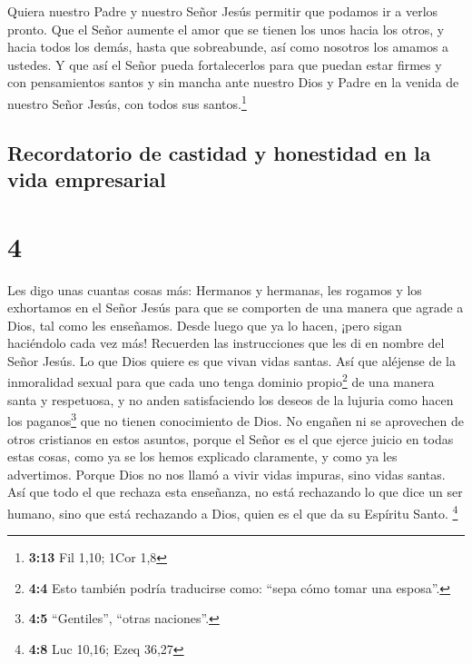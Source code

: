  Quiera nuestro Padre y nuestro Señor Jesús permitir que
podamos ir a verlos pronto.  Que el Señor aumente el amor
que se tienen los unos hacia los otros, y hacia todos los demás, hasta
que sobreabunde, así como nosotros los amamos a ustedes. 
Y que así el Señor pueda fortalecerlos para que puedan estar firmes y
con pensamientos santos y sin mancha ante nuestro Dios y Padre en la
venida de nuestro Señor Jesús, con todos sus santos.\footnote{\textbf{3:13}
  Fil 1,10; 1Cor 1,8}

\hypertarget{recordatorio-de-castidad-y-honestidad-en-la-vida-empresarial}{%
\subsection{Recordatorio de castidad y honestidad en la vida
empresarial}\label{recordatorio-de-castidad-y-honestidad-en-la-vida-empresarial}}

\hypertarget{section-3}{%
\section{4}\label{section-3}}

 Les digo unas cuantas cosas más: Hermanos y hermanas, les
rogamos y los exhortamos en el Señor Jesús para que se comporten de una
manera que agrade a Dios, tal como les enseñamos. Desde luego que ya lo
hacen, ¡pero sigan haciéndolo cada vez más!  Recuerden las
instrucciones que les di en nombre del Señor Jesús.  Lo
que Dios quiere es que vivan vidas santas. Así que aléjense de la
inmoralidad sexual  para que cada uno tenga dominio
propio\footnote{\textbf{4:4} Esto también podría traducirse como: ``sepa
  cómo tomar una esposa''.} de una manera santa y respetuosa,
 y no anden satisfaciendo los deseos de la lujuria como
hacen los paganos\footnote{\textbf{4:5} ``Gentiles'', ``otras
  naciones''.} que no tienen conocimiento de Dios.  No
engañen ni se aprovechen de otros cristianos en estos asuntos, porque el
Señor es el que ejerce juicio en todas estas cosas, como ya se los hemos
explicado claramente, y como ya les advertimos.  Porque
Dios no nos llamó a vivir vidas impuras, sino vidas santas.
 Así que todo el que rechaza esta enseñanza, no está
rechazando lo que dice un ser humano, sino que está rechazando a Dios,
quien es el que da su Espíritu Santo. \footnote{\textbf{4:8} Luc 10,16;
  Ezeq 36,27}

